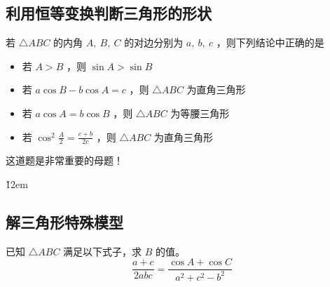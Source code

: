\subsection{利用恒等变换判断三角形的形状}

\begin{example}
    若 $\triangle A B C$ 的内角 $A, ~ B, ~ C$ 的对边分别为 $a, ~ b, ~ c$ ，则下列结论中正确的是
    \begin{itemize}
        \item 若 $A>B$ ，则 $\sin A>\sin B$
        \item 若 $a \cos B-b \cos A=c$ ，则 $\triangle A B C$ 为直角三角形
        \item 若 $a \cos A=b \cos B$ ，则 $\triangle A B C$ 为等腰三角形
        \item 若 $\cos ^2 \frac{A}{2}=\frac{c+b}{2 c}$ ，则 $\triangle A B C$ 为直角三角形
    \end{itemize}
\end{example}

\begin{warning}
    这道题是非常重要的母题！
\end{warning}

\v{12em}

\subsection{解三角形特殊模型}

\begin{example}
    已知 $\triangle A B C$ 满足以下式子，求 $B$ 的值。
    $$
        \frac{a+c}{2 a b c}=\frac{\cos A+\cos C}{a^2+c^2-b^2}
    $$
\end{example}
